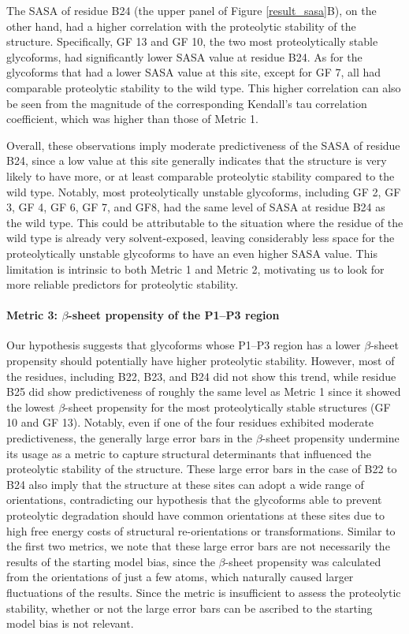 \documentclass[9pt]{elife}
\begin{document}
The SASA of residue B24 (the upper panel of Figure \ref{result_sasa}B), on the other hand, had a higher correlation with the proteolytic stability of the structure. Specifically, GF 13 and GF 10, the two most proteolytically stable glycoforms, had significantly lower SASA value at residue B24. As for the glycoforms that had a lower SASA value at this site, except for GF 7, all had comparable proteolytic stability to the wild type. This higher correlation can also be seen from the magnitude of the corresponding Kendall's tau correlation coefficient, which was higher than those of Metric 1.

Overall, these observations imply moderate predictiveness of the SASA of residue B24, since a low value at this site generally indicates that the structure is very likely to have more, or at least comparable proteolytic stability compared to the wild type. Notably, most proteolytically unstable glycoforms, including GF 2, GF 3, GF 4, GF 6, GF 7, and GF8, had the same level of SASA at residue B24 as the wild type. This could be attributable to the situation where the residue of the wild type is already very solvent-exposed, leaving considerably less space for the proteolytically unstable glycoforms to have an even higher SASA value. This limitation is intrinsic to both Metric 1 and Metric 2, motivating us to look for more reliable predictors for proteolytic stability. 

\paragraph{Metric 3: $\beta$-sheet propensity of the P1--P3 region}
Our hypothesis suggests that glycoforms whose P1--P3 region has a lower $\beta$-sheet propensity should potentially have higher proteolytic stability. However, most of the residues, including B22, B23, and B24 did not show this trend, while residue B25 did show predictiveness of roughly the same level as Metric 1 since it showed the lowest $\beta$-sheet propensity for the most proteolytically stable structures (GF 10 and GF 13). Notably, even if one of the four residues exhibited moderate predictiveness, the generally large error bars in the $\beta$-sheet propensity undermine its usage as a metric to capture structural determinants that influenced the proteolytic stability of the structure. These large error bars in the case of B22 to B24 also imply that the structure at these sites can adopt a wide range of orientations, contradicting our hypothesis that the glycoforms able to prevent proteolytic degradation should have common orientations at these sites due to high free energy costs of structural re-orientations or transformations. Similar to the first two metrics, we note that these large error bars are not necessarily the results of the starting model bias, since the $\beta$-sheet propensity was calculated from the orientations of just a few atoms, which naturally caused larger fluctuations of the results. Since the metric is insufficient to assess the proteolytic stability, whether or not the large error bars can be ascribed to the starting model bias is not relevant. 
\end{document}
